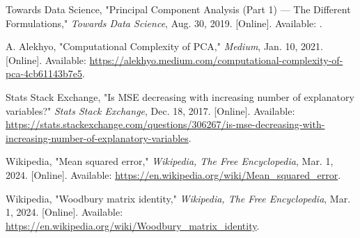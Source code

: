 \documentclass[11pt]{article}
\begin{document}
\begin{thebibliography}{99}

Towards Data Science, "Principal Component Analysis (Part 1) — The Different Formulations," \textit{Towards Data Science}, Aug. 30, 2019. [Online]. Available: .

A. Alekhyo, "Computational Complexity of PCA," \textit{Medium}, Jan. 10, 2021. [Online]. Available: \url{https://alekhyo.medium.com/computational-complexity-of-pca-4cb61143b7e5}.

Stats Stack Exchange, "Is MSE decreasing with increasing number of explanatory variables?" \textit{Stats Stack Exchange}, Dec. 18, 2017. [Online]. Available: \url{https://stats.stackexchange.com/questions/306267/is-mse-decreasing-with-increasing-number-of-explanatory-variables}.

Wikipedia, "Mean squared error," \textit{Wikipedia, The Free Encyclopedia}, Mar. 1, 2024. [Online]. Available: \url{https://en.wikipedia.org/wiki/Mean_squared_error}.

Wikipedia, "Woodbury matrix identity," \textit{Wikipedia, The Free Encyclopedia}, Mar. 1, 2024. [Online]. Available: \url{https://en.wikipedia.org/wiki/Woodbury_matrix_identity}.



\end{thebibliography}
\end{document}
